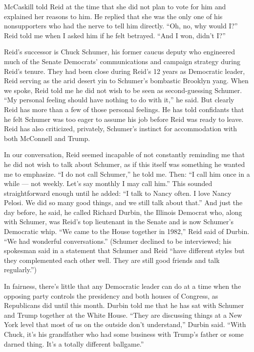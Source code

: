 McCaskill told Reid at the time that she did not plan to vote for him
and explained her reasons to him. He replied that she was the only one
of his nonsupporters who had the nerve to tell him directly. ``Oh, no,
why would I?'' Reid told me when I asked him if he felt betrayed. ``And
I won, didn't I?''

Reid's successor is Chuck Schumer, his former caucus deputy who
engineered much of the Senate Democrats' communications and campaign
strategy during Reid's tenure. They had been close during Reid's 12
years as Democratic leader, Reid serving as the arid desert yin to
Schumer's bombastic Brooklyn yang. When we spoke, Reid told me he did
not wish to be seen as second-guessing Schumer. ``My personal feeling
should have nothing to do with it,'' he said. But clearly Reid has more
than a few of those personal feelings. He has told confidants that he
felt Schumer was too eager to assume his job before Reid was ready to
leave. Reid has also criticized, privately, Schumer's instinct for
accommodation with both McConnell and Trump.

In our conversation, Reid seemed incapable of not constantly reminding
me that he did not wish to talk about Schumer, as if this itself was
something he wanted me to emphasize. ``I do not call Schumer,'' he told
me. Then: ``I call him once in a while --- not weekly. Let's say monthly
I may call him.'' This sounded straightforward enough until he added:
``I talk to Nancy often. I love Nancy Pelosi. We did so many good
things, and we still talk about that.'' And just the day before, he
said, he called Richard Durbin, the Illinois Democrat who, along with
Schumer, was Reid's top lieutenant in the Senate and is now Schumer's
Democratic whip. ``We came to the House together in 1982,'' Reid said of
Durbin. ``We had wonderful conversations.'' (Schumer declined to be
interviewed; his spokesman said in a statement that Schumer and Reid
``have different styles but they complemented each other well. They are
still good friends and talk regularly.'')

In fairness, there's little that any Democratic leader can do at a time
when the opposing party controls the presidency and both houses of
Congress, as Republicans did until this month. Durbin told me that he
has sat with Schumer and Trump together at the White House. ``They are
discussing things at a New York level that most of us on the outside
don't understand,'' Durbin said. ``With Chuck, it's his grandfather who
had some business with Trump's father or some darned thing. It's a
totally different ballgame.''

